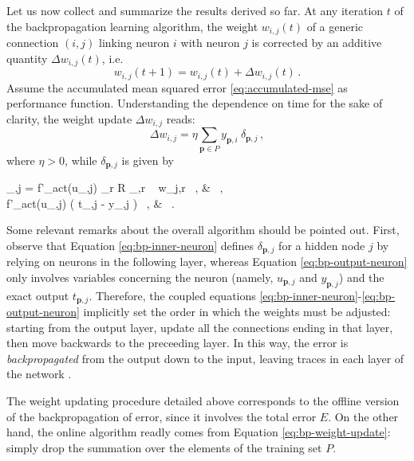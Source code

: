 \documentclass[11pt, a4paper]{report}
\numberwithin{equation}{chapter}
\theoremstyle{theorem}
\theoremstyle{definition}
\numberwithin{figure}{section}
\begin{document}
		Let us now collect and summarize the results derived so far. At any iteration $t$ of the backpropagation learning algorithm, the weight $w_{i,j}(t)$ of a generic connection $(i,j)$ linking neuron $i$ with neuron $j$ is corrected by an additive quantity $\Delta w_{i,j}(t)$, i.e. 
		\begin{equation*}
			w_{i,j}(t+1) = w_{i,j}(t) + \Delta w_{i,j}(t) \, .
		\end{equation*}
		Assume the accumulated mean squared error \eqref{eq:accumulated-mse} as performance function. Understanding the dependence on time for the sake of clarity, the weight update $\Delta w_{i,j}$ reads:
		\begin{equation*}
			\Delta w_{i,j} = \eta \sum_{\boldsymbol{p} \in P} y_{\boldsymbol{p},i} ~ \delta_{\boldsymbol{p},j} \, ,
		\end{equation*}
		where $\eta > 0$, while $\delta_{\boldsymbol{p},j}$ is given by
		\begin{subnumcases}{\delta_{,j} =}
			\label{eq:bp-inner-neuron}
		   	f'_{act}(u_{,j}) \sum_{r \in R} \delta_{,r} ~ w_{j,r} \, , &  \, , \\
		   	\label{eq:bp-output-neuron}
			 f'_{act}(u_{,j}) \left( t_{,j} - y_{,j} \right) \, , &  \, .
		\end{subnumcases}
				
		Some relevant remarks about the overall algorithm should be pointed out. First, observe that Equation \eqref{eq:bp-inner-neuron} defines $\delta_{\boldsymbol{p},j}$ for a hidden node $j$ by relying on neurons in the following layer, whereas Equation \eqref{eq:bp-output-neuron} only involves variables concerning the neuron (namely, $u_{\boldsymbol{p},j}$ and $y_{\boldsymbol{p},j}$) and the exact output $t_{\boldsymbol{p},j}$. Therefore, the coupled equations \eqref{eq:bp-inner-neuron}-\eqref{eq:bp-output-neuron} implicitly set the order in which the weights must be adjusted: starting from the output layer, update all the connections ending in that layer, then move backwards to the preceeding layer. In this way, the error is \emph{backpropagated} from the output down to the input, leaving traces in each layer of the network \cite{Kri, WH60}.
		
		The weight updating procedure detailed above corresponds to the offline version of the backpropagation of error, since it involves the total error $E$. On the other hand, the online algorithm readly comes from Equation \eqref{eq:bp-weight-update}: simply drop the summation over the elements of the training set $P$.
		
\end{document}

